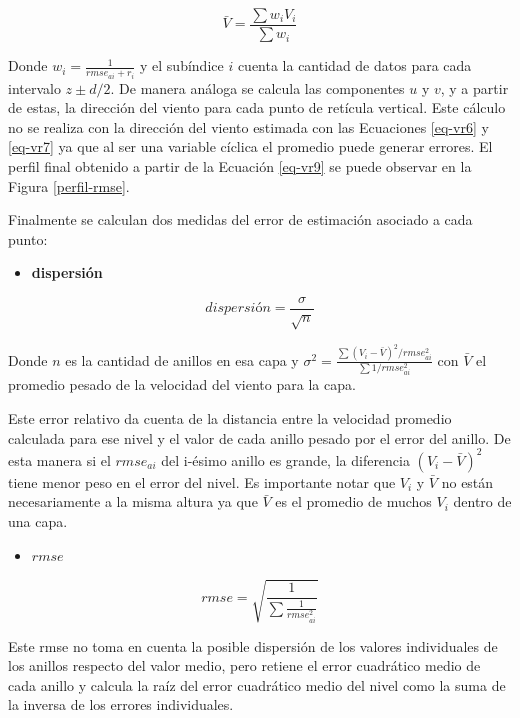 \documentclass[12pt,spanish,oneside, a4paper]{book}
\providecommand{\tightlist}{%
  \setlength{\itemsep}{0pt}\setlength{\parskip}{0pt}}
\begin{document}
\begin{equation}\label{eq-vr9}
\bar{V} = \frac {\sum w_i V_i} {\sum w_i}
\end{equation}

Donde \(w_i = \frac {1}{rmse_{ai} + r_i}\) y el subíndice \(i\) cuenta
la cantidad de datos para cada intervalo \(z \pm d/2\). De manera
análoga se calcula las componentes \(u\) y \(v\), y a partir de estas,
la dirección del viento para cada punto de retícula vertical. Este
cálculo no se realiza con la dirección del viento estimada con las
Ecuaciones \ref{eq-vr6} y \ref{eq-vr7} ya que al ser una variable
cíclica el promedio puede generar errores. El perfil final obtenido a
partir de la Ecuación \ref{eq-vr9} se puede observar en la Figura
\ref{perfil-rmse}.

Finalmente se calculan dos medidas del error de estimación asociado a
cada punto:

\begin{itemize}
\tightlist
\item
  \textbf{dispersión}
\end{itemize}

\begin{equation}\label{eq-vr10} 
dispersión = \frac{\sigma}{\sqrt{n}}
\end{equation}

Donde \(n\) es la cantidad de anillos en esa capa y
\(\sigma^{2}= \frac{\sum (V_i - \bar{V})^2 /rmse_{ai}^2}{\sum 1/rmse_{ai}^2}\)
con \(\bar{V}\) el promedio pesado de la velocidad del viento para la
capa.

Este error relativo da cuenta de la distancia entre la velocidad
promedio calculada para ese nivel y el valor de cada anillo pesado por
el error del anillo. De esta manera si el \(rmse_{ai}\) del i-ésimo
anillo es grande, la diferencia \((V_i - \bar{V})^2\) tiene menor peso
en el error del nivel. Es importante notar que \(V_i\) y \(\bar{V}\) no
están necesariamente a la misma altura ya que \(\bar{V}\) es el promedio
de muchos \(V_i\) dentro de una capa.

\begin{itemize}
\tightlist
\item
  \textbf{\(rmse\)}
\end{itemize}

\begin{equation}\label{eq-vr11}
rmse = \sqrt{\frac{1}{\sum \frac{1}{rmse_{ai}^2}}}
\end{equation}

Este rmse no toma en cuenta la posible dispersión de los valores
individuales de los anillos respecto del valor medio, pero retiene el
error cuadrático medio de cada anillo y calcula la raíz del error
cuadrático medio del nivel como la suma de la inversa de los errores
individuales.
\end{document}
